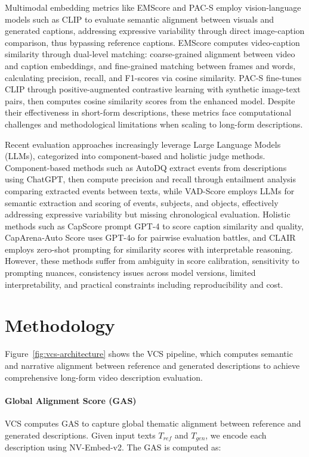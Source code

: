\documentclass[letterpaper]{article} %
\begin{document}
Multimodal embedding metrics like EMScore \citep{syxl:22} and PAC-S \citep{sbc:23} employ vision-language models such as CLIP \citep{Radford2021LearningTV} to evaluate semantic alignment between visuals and generated captions, addressing expressive variability through direct image-caption comparison, thus bypassing reference captions. EMScore computes video-caption similarity through dual-level matching: coarse-grained alignment between video and caption embeddings, and fine-grained matching between frames and words, calculating precision, recall, and F1-scores via cosine similarity. PAC-S fine-tunes CLIP through positive-augmented contrastive learning with synthetic image-text pairs, then computes cosine similarity scores from the enhanced model. Despite their effectiveness in short-form descriptions, these metrics face computational challenges and methodological limitations when scaling to long-form descriptions.

Recent evaluation approaches increasingly leverage Large Language Models (LLMs), categorized into component-based and holistic judge methods. Component-based methods such as AutoDQ \citep{wyzs:24} extract events from descriptions using ChatGPT, then compute precision and recall through entailment analysis comparing extracted events between texts, while VAD-Score \citep{dp:25} employs LLMs for semantic extraction and scoring of events, subjects, and objects, effectively addressing expressive variability but missing chronological evaluation. Holistic methods such as CapScore \citep{li:24} prompt GPT-4 to score caption similarity and quality, CapArena‑Auto Score \citep{cheng:25} uses GPT-4o for pairwise evaluation battles, and CLAIR \citep{chan:23} employs zero-shot prompting for similarity scores with interpretable reasoning. However, these methods suffer from ambiguity in score calibration, sensitivity to prompting nuances, consistency issues across model versions, limited interpretability, and practical constraints including reproducibility and cost.

\section{Methodology}
\label{sec:methodology_vcs}

Figure~\ref{fig:vcs-architecture} shows the VCS pipeline, which computes semantic and narrative alignment between reference and generated descriptions to achieve comprehensive long-form video description evaluation.

\paragraph{Global Alignment Score (GAS)}
VCS computes GAS to capture global thematic alignment between reference and generated descriptions. Given input texts $T_{ref}$ and $T_{gen}$, we encode each description using NV-Embed-v2. The GAS is computed as:
\end{document}
